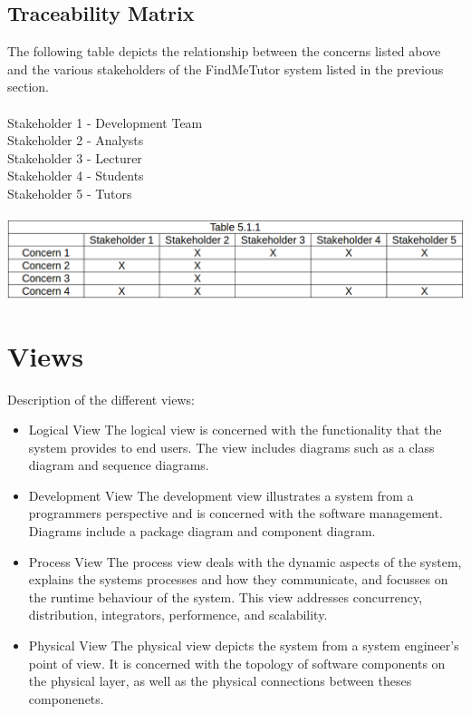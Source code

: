 \documentclass[12pt]{article}
\begin{document}
\subsection{Traceability Matrix}
The following table depicts the relationship between the concerns listed above and the various stakeholders of the FindMeTutor system listed in the previous section.\\\\
Stakeholder 1 - Development Team\\
Stakeholder 2 - Analysts\\
Stakeholder 3 - Lecturer\\
Stakeholder 4 - Students\\
Stakeholder 5 - Tutors\\\\
\includegraphics[width=140mm]{./trace.png}

\section{Views}
Description of the different views:
\begin{itemize}
\item Logical View
The logical view is concerned with the functionality that the system provides to end users. The view includes diagrams such as a class diagram and sequence diagrams.
\item Development View
The development view illustrates a system from a programmers perspective and is concerned with the software management. Diagrams include a package diagram and component diagram.
\item Process View
The process view deals with the dynamic aspects of the system, explains the systems processes and how they communicate, and focusses on the runtime behaviour of the system. This view addresses concurrency, distribution, integrators, performence, and scalability.
\item Physical View
The physical view depicts the system from a system engineer's point of view. It is concerned with the topology of software components on the physical layer, as well as the physical connections between theses componenets.
\end{itemize}
\end{document}
